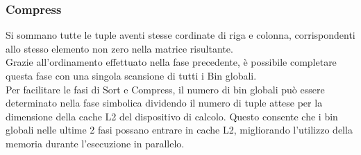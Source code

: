 \subsubsection{Compress}
Si sommano tutte le tuple aventi stesse cordinate di riga e colonna, corrispondenti allo stesso elemento non zero
nella matrice risultante.\\
Grazie all'ordinamento effettuato nella fase precedente, è possibile completare questa fase con una singola
scansione di tutti i Bin globali.\\


Per facilitare le fasi di Sort e Compress, il numero di bin globali può essere determinato nella fase simbolica 
dividendo il numero di tuple attese per la dimensione della cache L2 del dispositivo di calcolo.
Questo consente che i bin globali nelle ultime 2 fasi possano entrare in cache L2, 
migliorando l'utilizzo della memoria durante l'esecuzione in parallelo.\\









